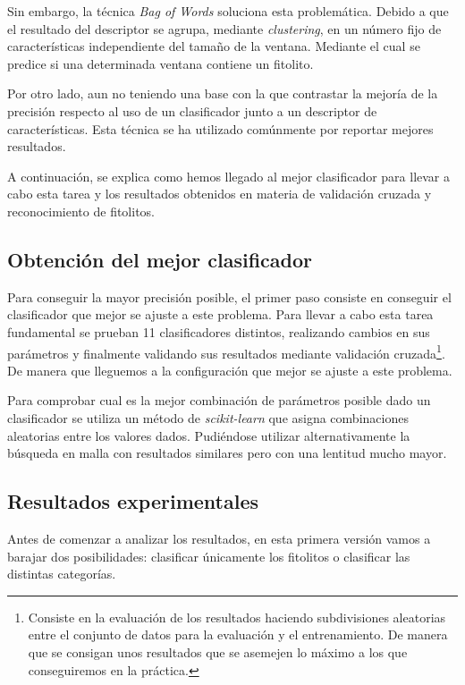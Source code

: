 Sin embargo, la técnica \textit{Bag of Words} soluciona esta problemática. Debido a que el resultado del descriptor se agrupa, mediante \textit{clustering}, en un número fijo de características independiente del tamaño de la ventana. Mediante el cual se predice si una determinada ventana contiene un fitolito.

Por otro lado, aun no teniendo una base con la que contrastar la mejoría de la precisión respecto al uso de un clasificador junto a un descriptor de características. Esta técnica se ha utilizado comúnmente por reportar mejores resultados. 

A continuación, se explica como hemos llegado al mejor clasificador para llevar a cabo esta tarea y los resultados obtenidos en materia de validación cruzada y reconocimiento de fitolitos.

\subsection{Obtención del mejor clasificador}

Para conseguir la mayor precisión posible, el primer paso consiste en conseguir el clasificador que mejor se ajuste a este problema. Para llevar a cabo esta tarea fundamental se prueban 11 clasificadores distintos, realizando cambios en sus parámetros y finalmente validando sus resultados mediante validación cruzada\footnote{Consiste en la evaluación de los resultados haciendo subdivisiones aleatorias entre el conjunto de datos para la evaluación y el entrenamiento. De manera que se consigan unos resultados que se asemejen lo máximo a los que conseguiremos en la práctica.}. De manera que lleguemos a la configuración que mejor se ajuste a este problema.

Para comprobar cual es la mejor combinación de parámetros posible dado un clasificador se utiliza un método de \textit{scikit-learn} que asigna combinaciones aleatorias entre los valores dados. Pudiéndose utilizar alternativamente la búsqueda en malla con resultados similares pero con una lentitud mucho mayor.

\subsection{Resultados experimentales}

Antes de comenzar a analizar los resultados, en esta primera versión vamos a barajar dos posibilidades: clasificar únicamente los fitolitos o clasificar las distintas categorías. 

